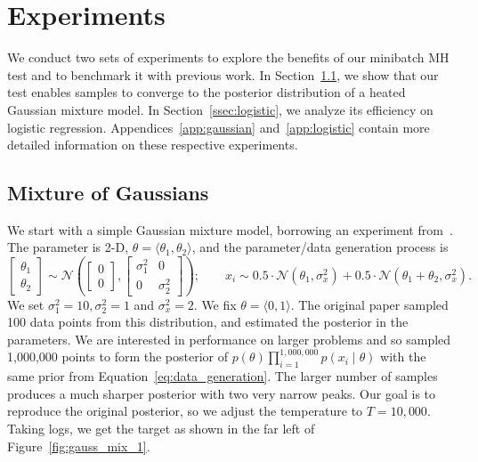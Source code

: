 \documentclass{article}
\begin{document}
\section{Experiments}\label{sec:experiments}

We conduct two sets of experiments to explore the benefits of our minibatch MH
test and to benchmark it with previous work. In Section~\ref{ssec:gaussians}, we
show that our test enables samples to converge to the posterior distribution of
a heated Gaussian mixture model. In Section~\ref{ssec:logistic}, we analyze its
efficiency on logistic regression.  Appendices~\ref{app:gaussian}
and~\ref{app:logistic} contain more detailed information on these respective
experiments.

\subsection{Mixture of Gaussians}\label{ssec:gaussians}

We start with a simple Gaussian mixture model, borrowing an experiment
from~\cite{langevin_2011}.  The parameter is 2-D, $\theta =
\langle \theta_1,\theta_2 \rangle$, and the parameter/data generation process is
\begin{equation}\label{eq:data_generation}
    \begin{bmatrix} \theta_1 \\ \theta_2 \end{bmatrix} 
    \sim \mathcal{N}\left(\begin{bmatrix}0 \\ 0\end{bmatrix}, 
    \begin{bmatrix} \sigma_1^2 & 0 \\ 0 & \sigma_2^2\end{bmatrix} \right);\quad \quad x_i \sim
    0.5 \cdot \mathcal{N}(\theta_1, \sigma_x^2) + 0.5 \cdot \mathcal{N}(\theta_1+\theta_2, \sigma_x^2).
\end{equation}
We set $\sigma_1^2 = 10, \sigma_2^2 = 1$ and $\sigma_x^2=2$.  We fix $\theta =
\langle 0,1 \rangle$. The original paper sampled 100 data points from this
distribution, and estimated the posterior in the parameters. We are interested
in performance on larger problems and so sampled 1,000,000 points to form the
posterior of $p(\theta)\prod_{i=1}^{1,000,000}p(x_i\mid \theta)$ with the same
prior from Equation~\ref{eq:data_generation}. The larger number of samples
produces a much sharper posterior with two very narrow peaks.  Our goal is to
reproduce the original posterior, so we adjust the temperature to $T=10,000$.
Taking logs, we get the target as shown in the far left of
Figure~\ref{fig:gauss_mix_1}.
\end{document}
